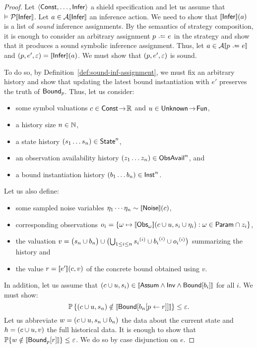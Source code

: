 \documentclass[acmsmall,screen,nonacm]{acmart}
\begin{document}
\begin{proof}
  Let $\left\langle\mathsf{Const},\dots,\mathsf{Infer}\right\rangle$ a shield specification and let us assume that $\Fvalid \ProofSem{\Inference}$. Let $a \in \InfActionSem{\Inference}$ an inference action. We need to show that $\sem{\Inference}(a)$ is a list of \emph{sound} inference assignments. By the semantics of strategy composition, it is enough to consider an arbitrary assignment $p \slassign e$ in the strategy and show that it produces a sound symbolic inference assignment. Thus, let $a \in \InfActionSem{p \slassign e}$ and $(p, e', \Eps) = \sem{\Inference}(a)$. We must show that $(p, e', \varepsilon)$ is sound.

  To do so, by Definition~\ref{def:sound-inf-assignment}, we must fix an arbitrary history and show that updating the latest bound instantiation with $e'$ preserves the truth of $\mathsf{Bound}_p$. Thus, let us consider:
  \begin{itemize}
    \item some symbol valuations $c \in \mathsf{Const} \mathrel{\!\to\!} \mathbb{R}$ and $u \in \mathsf{Unknown} \mathrel{\!\to\!} \mathsf{Fun}$,
    \item a history size $n \in \mathbb{N}$,
    \item a state history $(s_1 \dots s_{n}) \in \mathsf{State}^{n}$,
    \item an observation availability history $(z_1 \dots z_{n}) \in \mathsf{ObsAvail}^{n}$, and
    \item a bound instantiation history $(b_1 \dots b_{n}) \in \mathsf{Inst}^{n}$.
  \end{itemize}
  Let us also define:
  \begin{itemize}
    \item some sampled noise variables $\eta_1 \cdots \eta_{n} \sim \sem{\Noise}(c)$,
    \item corresponding observations $o_i = \{\omega \mapsto \sem{\Obs_\omega}(c \CatValuation u, s_i \CatValuation \eta_i) : \omega \in \Param \cap z_i \}$,
    \item the valuation $v = \bigl(s_n \cup b_n \bigr) \cup \bigl(\bigcup_{1 \le i \le n} {s_i}^{(i)} \cup {b_i}^{(i)} \cup {o_i}^{(i)}\bigr)$ summarizing the history and
    \item the value $r = \sem{e'}(c, v)$ of the concrete bound obtained using $v$.
  \end{itemize}
  In addition, let us assume that $(c \CatValuation u, s_i) \in \sem{\Assum \land \Inv \land \BoundConj{b_i}}$ for all $i$. We must show: \[\Prob\left\{ (c \CatValuation u, s_{n}) \notin \sem{\BoundConj{\UpdateMap{b_n}{p}{r}}} \right\} \le \Eps.\]
  Let us abbreviate $w = (c \cup u, s_n \cup b_n)$ the data about the current state and $h = (c \cup u, v)$ the full historical data. It is enough to show that $\Prob\{ \latestEnv \notin \sem{\BoundWith{p}{r}} \} \le \Eps$. We do so by case disjunction on $e$.

\end{proof}
\end{document}
